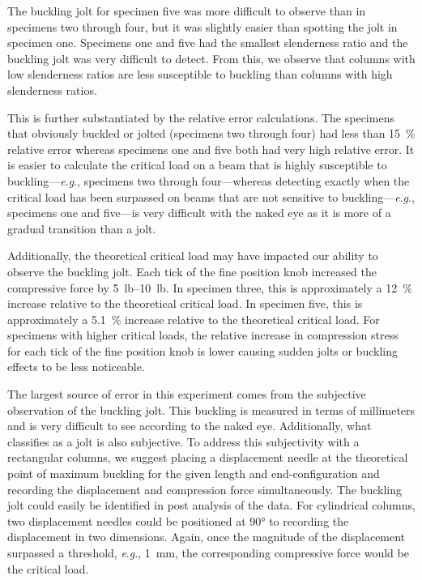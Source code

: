 \documentclass[12 pt]{article}
\newcommand{\eg}{\textit{e}.\textit{g}., }
\begin{document}
The buckling jolt for specimen five was more difficult to observe than in specimens two through four, but it was slightly easier than spotting the jolt in specimen one. Specimens one and five had the smallest slenderness ratio and the buckling jolt was very difficult to detect. From this, we observe that columns with low slenderness ratios are less susceptible to buckling than columns with high slenderness ratios.

This is further substantiated by the relative error calculations. The specimens that obviously buckled or jolted (specimens two through four) had less than \qty{15}{\percent} relative error whereas specimens one and five both had very high relative error. It is easier to calculate the critical load on a beam that is highly susceptible to buckling---\eg specimens two through four---whereas detecting exactly when the critical load has been surpassed on beams that are not sensitive to buckling---\eg specimens one and five---is very difficult with the naked eye as it is more of a gradual transition than a jolt.

Additionally, the theoretical critical load may have impacted our ability to observe the buckling jolt. Each tick of the fine position knob increased the compressive force by \qtyrange{5}{10}{lb}. In specimen three, this is approximately a \qty{12}{\percent} increase relative to the theoretical critical load. In specimen five, this is approximately a \qty{5.1}{\percent} increase relative to the theoretical critical load. For specimens with higher critical loads, the relative increase in compression stress for each tick of the fine position knob is lower causing sudden jolts or buckling effects to be less noticeable.

The largest source of error in this experiment comes from the subjective observation of the buckling jolt. This buckling is measured in terms of millimeters and is very difficult to see according to the naked eye. Additionally, what classifies as a jolt is also subjective. To address this subjectivity with a rectangular columns, we suggest placing a displacement needle at the theoretical point of maximum buckling for the given length and end-configuration and recording the displacement and compression force simultaneously. The buckling jolt could easily be identified in post analysis of the data. For cylindrical columns, two displacement needles could be positioned at \ang{90} to recording the displacement in two dimensions. Again, once the magnitude of the displacement surpassed a threshold, \eg \qty{1}{\mm}, the corresponding compressive force would be the critical load.
\end{document}
